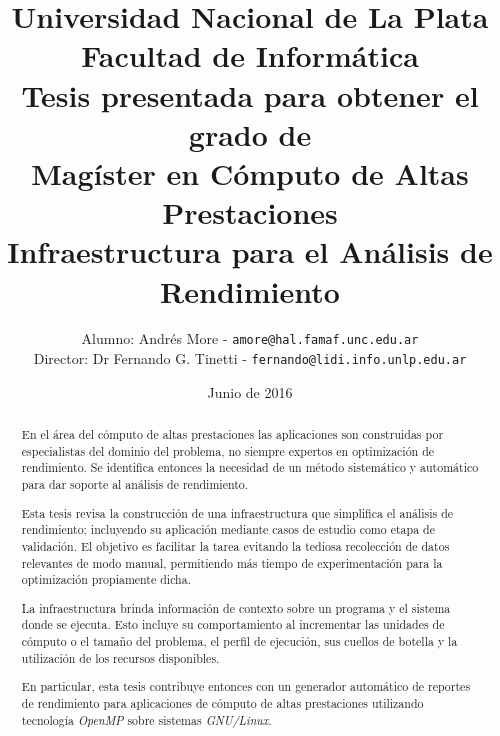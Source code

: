 \documentclass[a4paper]{report}
\begin{document}
\setlength{\parindent}{0cm}
\renewcommand{\tablename}{Tabla}

\title{Universidad Nacional de La Plata\\Facultad de Informática\\ \bigskip
{\large Tesis presentada para obtener el grado de \\}  Magíster en Cómputo de Altas Prestaciones\\ \bigskip
  Infraestructura para el Análisis de Rendimiento}

\author{
  Alumno: Andrés More - {\tt amore@hal.famaf.unc.edu.ar}\\
  Director: Dr Fernando G. Tinetti - {\tt fernando@lidi.info.unlp.edu.ar}
}

\date{Junio de 2016}

\maketitle

\begin{abstract}

En el área del cómputo de altas prestaciones las aplicaciones son construidas por especialistas del dominio del problema, no siempre expertos en optimización de rendimiento. Se identifica entonces la necesidad de un método sistemático y automático para dar soporte al análisis de rendimiento.

\bigskip

Esta tesis revisa la construcción de una infraestructura que simplifica el análisis de rendimiento; incluyendo su aplicación mediante casos de estudio como etapa de validación. El objetivo es facilitar la tarea evitando la tediosa recolección de datos relevantes de modo manual, permitiendo más tiempo de experimentación para la optimización propiamente dicha.

\bigskip

La infraestructura brinda información de contexto sobre un programa y el sistema donde se ejecuta. Esto incluye su comportamiento al incrementar las unidades de cómputo o el tamaño del problema,
el perfil de ejecución, sus cuellos de botella y la utilización de los recursos disponibles.

\bigskip

En particular, esta tesis contribuye entonces con un generador automático de reportes de rendimiento para aplicaciones de cómputo de altas prestaciones utilizando tecnología {\it OpenMP} sobre sistemas {\it GNU/Linux}.

\end{abstract}
\end{document}
